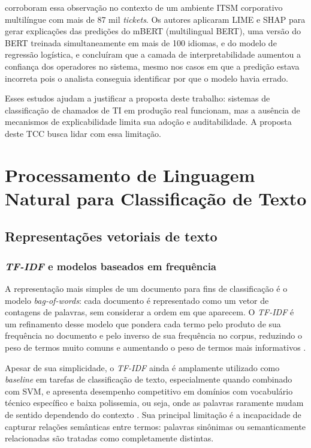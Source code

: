 \documentclass[
    12pt,                %
    openright,           %
    oneside,             %
    a4paper,             %
    english,             %
    brazil               %
]{abntex2}
\begin{document}
 corroboram essa observação no contexto de um ambiente ITSM corporativo multilíngue com mais de 87 mil \textit{tickets}. Os autores aplicaram LIME e SHAP para gerar explicações das predições do mBERT (multilingual BERT), uma versão do BERT treinada simultaneamente em mais de 100 idiomas, e do modelo de regressão logística, e concluíram que a camada de interpretabilidade aumentou a confiança dos operadores no sistema, mesmo nos casos em que a predição estava incorreta pois o analista conseguia identificar por que o modelo havia errado.

Esses estudos ajudam a justificar a proposta deste trabalho: sistemas de classificação de chamados de TI em produção real funcionam, mas a ausência de mecanismos de explicabilidade limita sua adoção e auditabilidade. A proposta deste TCC busca lidar com essa limitação.

\section{Processamento de Linguagem Natural para Classificação de Texto}
\label{sec:pln}

\subsection{Representações vetoriais de texto}
\label{subsec:pln_representacoes}

\subsubsection{\textit{TF-IDF} e modelos baseados em frequência}
\label{subsubsec:pln_tfidf}

A representação mais simples de um documento para fins de classificação é o modelo \textit{bag-of-words}: cada documento é representado como um vetor de contagens de palavras, sem considerar a ordem em que aparecem. O \textit{TF-IDF} é um refinamento desse modelo que pondera cada termo pelo produto de sua frequência no documento e pelo inverso de sua frequência no corpus, reduzindo o peso de termos muito comuns e aumentando o peso de termos mais informativos \cite{razma2026}.

Apesar de sua simplicidade, o \textit{TF-IDF} ainda é amplamente utilizado como \textit{baseline} em tarefas de classificação de texto, especialmente quando combinado com SVM, e apresenta desempenho competitivo em domínios com vocabulário técnico específico e baixa polissemia, ou seja, onde as palavras raramente mudam de sentido dependendo do contexto \cite{wahba2023}. Sua principal limitação é a incapacidade de capturar relações semânticas entre termos: palavras sinônimas ou semanticamente relacionadas são tratadas como completamente distintas.
\end{document}
